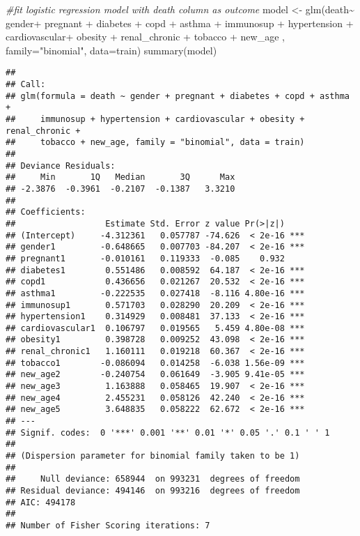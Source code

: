 \documentclass[
]{article}
\newenvironment{Shaded}{\begin{snugshade}}{\end{snugshade}}
\newcommand{\AttributeTok}[1]{\textcolor[rgb]{0.77,0.63,0.00}{#1}}
\newcommand{\CommentTok}[1]{\textcolor[rgb]{0.56,0.35,0.01}{\textit{#1}}}
\newcommand{\FunctionTok}[1]{\textcolor[rgb]{0.00,0.00,0.00}{#1}}
\newcommand{\NormalTok}[1]{#1}
\newcommand{\OtherTok}[1]{\textcolor[rgb]{0.56,0.35,0.01}{#1}}
\newcommand{\SpecialCharTok}[1]{\textcolor[rgb]{0.00,0.00,0.00}{#1}}
\newcommand{\StringTok}[1]{\textcolor[rgb]{0.31,0.60,0.02}{#1}}
\begin{document}
\begin{Shaded}
\begin{Highlighting}[]
\CommentTok{\#fit logistic regression model with death column as outcome}
\NormalTok{model }\OtherTok{\textless{}{-}} \FunctionTok{glm}\NormalTok{(death}\SpecialCharTok{\textasciitilde{}}\NormalTok{ gender}\SpecialCharTok{+}\NormalTok{ pregnant }\SpecialCharTok{+}\NormalTok{ diabetes }\SpecialCharTok{+}\NormalTok{ copd }\SpecialCharTok{+}\NormalTok{ asthma }\SpecialCharTok{+}\NormalTok{ immunosup }\SpecialCharTok{+}\NormalTok{ hypertension }\SpecialCharTok{+}\NormalTok{ cardiovascular}\SpecialCharTok{+} 
\NormalTok{               obesity }\SpecialCharTok{+}\NormalTok{ renal\_chronic }\SpecialCharTok{+}\NormalTok{ tobacco  }\SpecialCharTok{+}\NormalTok{ new\_age , }\AttributeTok{family=}\StringTok{"binomial"}\NormalTok{, }\AttributeTok{data=}\NormalTok{train)}
\FunctionTok{summary}\NormalTok{(model)}
\end{Highlighting}
\end{Shaded}

\begin{verbatim}
## 
## Call:
## glm(formula = death ~ gender + pregnant + diabetes + copd + asthma + 
##     immunosup + hypertension + cardiovascular + obesity + renal_chronic + 
##     tobacco + new_age, family = "binomial", data = train)
## 
## Deviance Residuals: 
##     Min       1Q   Median       3Q      Max  
## -2.3876  -0.3961  -0.2107  -0.1387   3.3210  
## 
## Coefficients:
##                  Estimate Std. Error z value Pr(>|z|)    
## (Intercept)     -4.312361   0.057787 -74.626  < 2e-16 ***
## gender1         -0.648665   0.007703 -84.207  < 2e-16 ***
## pregnant1       -0.010161   0.119333  -0.085    0.932    
## diabetes1        0.551486   0.008592  64.187  < 2e-16 ***
## copd1            0.436656   0.021267  20.532  < 2e-16 ***
## asthma1         -0.222535   0.027418  -8.116 4.80e-16 ***
## immunosup1       0.571703   0.028290  20.209  < 2e-16 ***
## hypertension1    0.314929   0.008481  37.133  < 2e-16 ***
## cardiovascular1  0.106797   0.019565   5.459 4.80e-08 ***
## obesity1         0.398728   0.009252  43.098  < 2e-16 ***
## renal_chronic1   1.160111   0.019218  60.367  < 2e-16 ***
## tobacco1        -0.086094   0.014258  -6.038 1.56e-09 ***
## new_age2        -0.240754   0.061649  -3.905 9.41e-05 ***
## new_age3         1.163888   0.058465  19.907  < 2e-16 ***
## new_age4         2.455231   0.058126  42.240  < 2e-16 ***
## new_age5         3.648835   0.058222  62.672  < 2e-16 ***
## ---
## Signif. codes:  0 '***' 0.001 '**' 0.01 '*' 0.05 '.' 0.1 ' ' 1
## 
## (Dispersion parameter for binomial family taken to be 1)
## 
##     Null deviance: 658944  on 993231  degrees of freedom
## Residual deviance: 494146  on 993216  degrees of freedom
## AIC: 494178
## 
## Number of Fisher Scoring iterations: 7
\end{verbatim}
\end{document}
